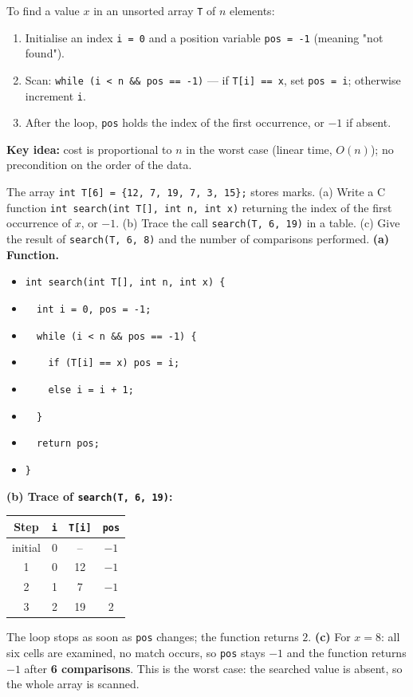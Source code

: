 \documentclass[11pt]{article}
\begin{document}
\begin{methode}
To find a value $x$ in an unsorted array \texttt{T} of $n$ elements:
\begin{enumerate}
\item Initialise an index \texttt{i = 0} and a position variable \texttt{pos = -1} (meaning "not found").
\item Scan: \texttt{while (i < n \&\& pos == -1)} — if \texttt{T[i] == x}, set \texttt{pos = i}; otherwise increment \texttt{i}.
\item After the loop, \texttt{pos} holds the index of the first occurrence, or $-1$ if absent.
\end{enumerate}
\textbf{Key idea:} cost is proportional to $n$ in the worst case (linear time, $O(n)$); no precondition on the order of the data.
\end{methode}

\begin{exoresolu}
The array \texttt{int T[6] = \{12, 7, 19, 7, 3, 15\};} stores marks. (a) Write a C function \texttt{int search(int T[], int n, int x)} returning the index of the first occurrence of $x$, or $-1$. (b) Trace the call \texttt{search(T, 6, 19)} in a table. (c) Give the result of \texttt{search(T, 6, 8)} and the number of comparisons performed.
\tcblower
\textbf{(a) Function.}
\begin{itemize}
\item \texttt{int search(int T[], int n, int x) \{}
\item \texttt{\ \ int i = 0, pos = -1;}
\item \texttt{\ \ while (i < n \&\& pos == -1) \{}
\item \texttt{\ \ \ \ if (T[i] == x) pos = i;}
\item \texttt{\ \ \ \ else i = i + 1;}
\item \texttt{\ \ \}}
\item \texttt{\ \ return pos;}
\item \texttt{\}}
\end{itemize}
\textbf{(b) Trace of \texttt{search(T, 6, 19)}:}
\begin{center}
\begin{tabular}{|c|c|c|c|}
\hline
\rowcolor{popblueL} Step & \texttt{i} & \texttt{T[i]} & \texttt{pos} \\
\hline
initial & 0 & -- & $-1$ \\
\hline
1 & 0 & 12 & $-1$ \\
\hline
2 & 1 & 7 & $-1$ \\
\hline
3 & 2 & 19 & 2 \\
\hline
\end{tabular}
\end{center}
The loop stops as soon as \texttt{pos} changes; the function returns $2$.
\textbf{(c)} For $x = 8$: all six cells are examined, no match occurs, so \texttt{pos} stays $-1$ and the function returns $-1$ after \textbf{6 comparisons}. This is the worst case: the searched value is absent, so the whole array is scanned.
\end{exoresolu}
\end{document}
